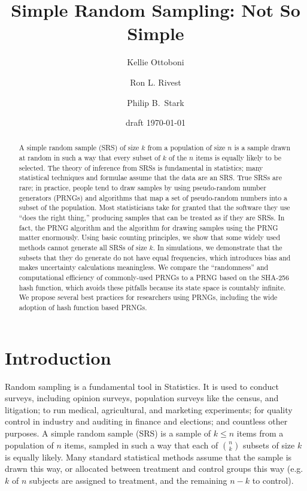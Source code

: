 \documentclass[12pt]{article}
\begin{document}
\title{Simple Random Sampling: Not So Simple}
\author{Kellie Ottoboni
\and
Ron L. Rivest
\and
Philip B.~Stark 
}

\date{draft \today}




\maketitle

\begin{abstract}
\small
A simple random sample (SRS) of size $k$ from a population of size $n$ is a sample drawn 
at random in such a way that every subset of $k$ of the $n$ items is equally likely to be selected. 
The theory of inference from SRSs is fundamental in statistics;
many statistical techniques and formulae assume that the data are an SRS.
True SRSs are rare; in practice, people tend to draw samples by using pseudo-random number generators 
(PRNGs) and algorithms that map a set of pseudo-random numbers into a subset of the population. 
Most statisticians take for granted that the software they use ``does the right thing,''
producing samples that can be treated as if they are SRSs.
In fact, the PRNG algorithm and the algorithm for drawing samples using the PRNG matter
enormously.
Using basic counting principles, we show that some widely used methods cannot generate all SRSs of size $k$.
In simulations, we demonstrate that the subsets that they do generate do not have equal frequencies, which
introduces bias and makes uncertainty calculations meaningless.
We compare the ``randomness'' and computational efficiency of commonly-used PRNGs to a PRNG 
based on the SHA-256 hash function, which avoids these pitfalls because its state space is countably infinite.
We propose several best practices for researchers using PRNGs, including the wide adoption of hash function based PRNGs.
\end{abstract}


\newpage
\tableofcontents
\newpage 

\section{Introduction}
Random sampling is a  fundamental tool in Statistics.
It is used to conduct surveys, including opinion surveys, population surveys like the census, and litigation; 
to run medical, agricultural, and marketing experiments; 
for quality control in industry and auditing in finance and elections;
and countless other purposes.
A simple random sample (SRS) is a sample of $k \leq n$ items from a population of $n$ items,
sampled in such a way that each of ${n \choose k}$ subsets of size $k$ is equally likely.
Many standard statistical methods assume that the sample is drawn this way, 
or allocated between treatment and control groups this way
(e.g. $k$ of $n$ subjects are assigned to treatment, and the remaining $n-k$ to control).
\end{document}
